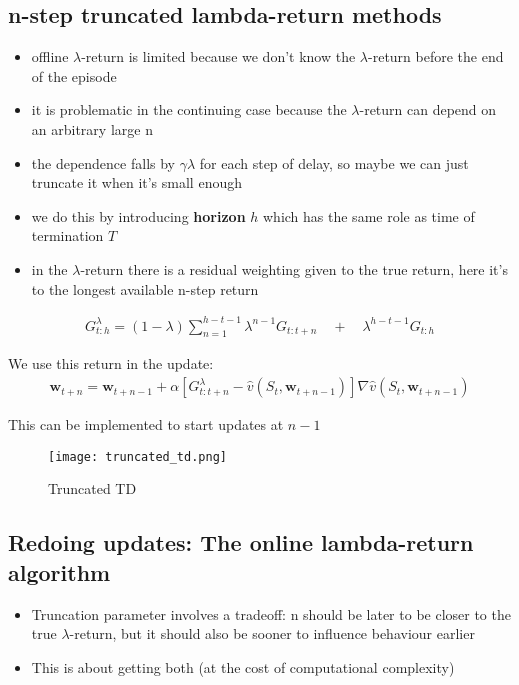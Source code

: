 \documentclass[sutton_barto_notes.tex]{subfiles}
\begin{document}
\subsection{n-step truncated lambda-return methods}

\begin{itemize}
\item offline $\lambda$-return is limited because we don’t know the $\lambda$-return before the end of the episode 
\item it is problematic in the continuing case because the $\lambda$-return can depend on an arbitrary large n 
\item the dependence falls by $\gamma \lambda$ for each step of delay, so maybe we can just truncate it when it’s small enough 
\item we do this by introducing \textbf{horizon} $h$ which has the same role as time of termination $T$ 
\item in the $\lambda$-return there is a residual weighting given to the true return, here it’s to the longest available n-step return 
\end{itemize}
\begin{align}G_{t:h}^{\lambda} = (1 - \lambda) \sum_{n=1}^{h-t-1} \lambda^{n-1} G_{t:t+n} \quad + \quad \lambda^{h-t-1}G_{t:h} \label{eq:12.7}\tag{12.7}\end{align}

 We use this return in the update: 
\begin{align}\mathbf{w}_{t+n} = \mathbf{w}_{t+n-1} + \alpha [G_{t:t+n}^{\lambda} - \hat{v}(S_t, \mathbf{w}_{t+n-1})] \nabla \hat{v}(S_t, \mathbf{w}_{t+n-1}) \label{eq:12.8}\tag{12.8}\end{align}

 This can be implemented to start updates at $n-1$ 

\begin{figure}[h!]
    \centering
     \texttt{[image: truncated\_td.png]}
    \caption{Truncated TD}
\end{figure}

\subsection{Redoing updates: The online lambda-return algorithm}

\begin{itemize}
\item Truncation parameter involves a tradeoff: n should be later to be closer to the true $\lambda$-return, but it should also be sooner to influence behaviour earlier 
\item This is about getting both (at the cost of computational complexity) 
\end{itemize}
\end{document}
